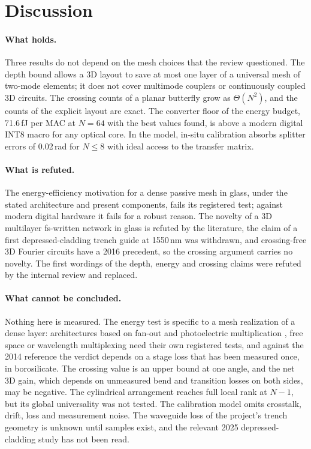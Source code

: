 \documentclass[11pt,a4paper]{article}
\newcommand{\fJ}{\,fJ\xspace}
\begin{document}
\section{Discussion}
\label{sec:discussion}

\paragraph{What holds.} Three results do not depend on the mesh choices that the review questioned. The depth bound allows a 3D layout to save at most one layer of a universal mesh of two-mode elements; it does not cover multimode couplers or continuously coupled 3D circuits. The crossing counts of a planar butterfly grow as $\Theta(N^2)$, and the counts of the explicit layout are exact. The converter floor of the energy budget, 71.6\fJ per MAC at $N=64$ with the best values found, is above a modern digital INT8 macro for any optical core. In the model, in-situ calibration absorbs splitter errors of 0.02\,rad for $N\le8$ with ideal access to the transfer matrix.

\paragraph{What is refuted.} The energy-efficiency motivation for a dense passive mesh in glass, under the stated architecture and present components, fails its registered test; against modern digital hardware it fails for a robust reason. The novelty of a 3D multilayer fs-written network in glass is refuted by the literature, the claim of a first depressed-cladding trench guide at 1550\,nm was withdrawn, and crossing-free 3D Fourier circuits have a 2016 precedent, so the crossing argument carries no novelty. The first wordings of the depth, energy and crossing claims were refuted by the internal review and replaced.

\paragraph{What cannot be concluded.} Nothing here is measured. The energy test is specific to a mesh realization of a dense layer: architectures based on fan-out and photoelectric multiplication \cite{Hamerly2019}, free space or wavelength multiplexing need their own registered tests, and against the 2014 reference the verdict depends on a stage loss that has been measured once, in borosilicate. The crossing value is an upper bound at one angle, and the net 3D gain, which depends on unmeasured bend and transition losses on both sides, may be negative. The cylindrical arrangement reaches full local rank at $N-1$, but its global universality was not tested. The calibration model omits crosstalk, drift, loss and measurement noise. The waveguide loss of the project's trench geometry is unknown until samples exist, and the relevant 2025 depressed-cladding study \cite{Zhou2025} has not been read.
\end{document}
